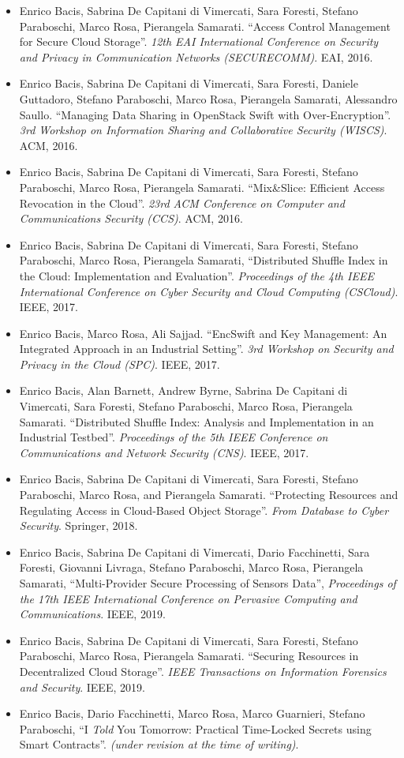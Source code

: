 \begin{itemize}
\item Enrico Bacis, Sabrina De Capitani di Vimercati, Sara Foresti, Stefano Paraboschi, Marco Rosa, Pierangela Samarati. ``Access Control Management for Secure Cloud Storage''. {\em 12th EAI International Conference on Security and Privacy in Communication Networks (SECURECOMM)}. EAI, 2016.
\item Enrico Bacis, Sabrina De Capitani di Vimercati, Sara Foresti, Daniele Guttadoro, Stefano Paraboschi, Marco Rosa, Pierangela Samarati, Alessandro Saullo. ``Managing Data Sharing in OpenStack Swift with Over-Encryption''. {\em 3rd Workshop on Information Sharing and Collaborative Security (WISCS)}. ACM, 2016.
\item Enrico Bacis, Sabrina De Capitani di Vimercati, Sara Foresti, Stefano Paraboschi, Marco Rosa, Pierangela Samarati. ``Mix\&Slice: Efficient Access Revocation in the Cloud''. {\em 23rd ACM Conference on Computer and Communications Security (CCS)}. ACM, 2016.
\item Enrico Bacis, Sabrina De Capitani di Vimercati, Sara Foresti, Stefano Paraboschi, Marco Rosa, Pierangela Samarati, ``Distributed Shuffle Index in the Cloud: Implementation and Evaluation''. {\em Proceedings of the 4th IEEE International Conference on Cyber Security and Cloud Computing (CSCloud)}. IEEE, 2017.
\item Enrico Bacis, Marco Rosa, Ali Sajjad. ``EncSwift and Key Management: An Integrated Approach in an Industrial Setting''. {\em 3rd Workshop on Security and Privacy in the Cloud (SPC)}. IEEE, 2017.
\item Enrico Bacis, Alan Barnett, Andrew Byrne, Sabrina De Capitani di Vimercati, Sara Foresti, Stefano Paraboschi, Marco Rosa, Pierangela Samarati. ``Distributed Shuffle Index: Analysis and Implementation in an Industrial Testbed''. {\em Proceedings of the 5th IEEE Conference on Communications and Network Security (CNS)}. IEEE, 2017.
\item Enrico Bacis, Sabrina De Capitani di Vimercati, Sara Foresti, Stefano Paraboschi, Marco Rosa, and Pierangela Samarati. ``Protecting Resources and Regulating Access in Cloud-Based Object Storage''. {\em From Database to Cyber Security}. Springer, 2018.
\item Enrico Bacis, Sabrina De Capitani di Vimercati, Dario Facchinetti, Sara Foresti, Giovanni Livraga, Stefano Paraboschi, Marco Rosa, Pierangela Samarati, ``Multi-Provider Secure Processing of Sensors Data'', {\em Proceedings of the 17th IEEE International Conference on Pervasive Computing and Communications}. IEEE, 2019.
\item Enrico Bacis, Sabrina De Capitani di Vimercati, Sara Foresti, Stefano Paraboschi, Marco Rosa, Pierangela Samarati. ``Securing Resources in Decentralized Cloud Storage''. {\em IEEE Transactions on Information Forensics and Security}. IEEE, 2019.
\item Enrico Bacis, Dario Facchinetti, Marco Rosa, Marco Guarnieri, Stefano Paraboschi, ``I {\em Told} You Tomorrow: Practical Time-Locked Secrets using Smart Contracts''. {\em (under revision at the time of writing)}.
\end{itemize}
